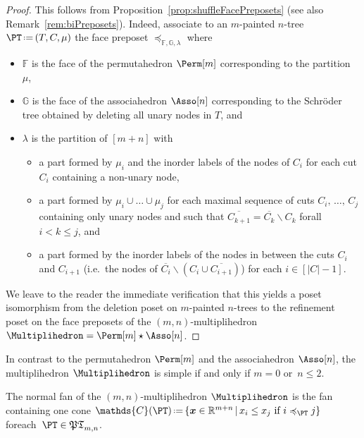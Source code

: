 \documentclass[AHL,Unicode,longabstracts,published]{cedram}
\newcommand{\R}{\mathbb{R}}
\renewcommand{\b}[1]{\boldsymbol{#1}}
\newcommand{\f}[1]{\mathfrak{#1}}
\newcommand{\ssm}{\smallsetminus}
\newcommand{\eqdef}{\mbox{\,\raisebox{0.2ex}{\scriptsize\ensuremath{\mathrm:}}\ensuremath{=}\,}}
\newcommand{\ie}{i.e.~}
\newcommand{\shuffleDP}{\star} %
\newcommand{\polytope}[1]{\mathds{#1}}
\newcommand{\stump}[1]{\overline{#1}}
\begin{document}
\begin{proof}
This follows from Proposition~\ref{prop:shuffleFacePreposets} (see also Remark~\ref{rem:biPreposets}). Indeed, associate to an $m$-painted $n$-tree $\PT \eqdef (T, C, \mu)$ the face preposet $\preccurlyeq_{\polytope{F}, \polytope{G}, \lambda}$ where
\begin{itemize}
\item $\polytope{F}$ is the face of the permutahedron $\Perm[m]$ corresponding to the partition~$\mu$,
\item $\polytope{G}$ is the face of the associahedron $\Asso[n]$ corresponding to the Schr\"oder tree obtained by deleting all unary nodes in $T$, and
\item $\lambda$ is the partition of $[m+n]$ with
\begin{itemize}
\item a part formed by $\mu_i$ and the inorder labels of the nodes of $C_i$ for each cut $C_i$ containing a non-unary node,
\item a part formed by $\mu_i \cup \dots \cup \mu_j$ for each maximal sequence of cuts $C_i,\,\dots,\,C_j$ containing only unary nodes and such that $\stump{C_{k+1}} = \stump{C_k} \ssm C_k$ for\linebreak all~$i < k \le j$, and
\item a part formed by the inorder labels of the nodes in between the cuts $C_i$ and $C_{i+1}$ (\ie the nodes of $\stump{C_i} \ssm (C_i \cup \stump{C_{i+1}})$) for each $i \in [|C|-1]$.
\end{itemize}
\end{itemize}
We leave to the reader the immediate verification that this yields a poset isomorphism from the deletion poset on $m$-painted $n$-trees to the refinement poset on the face preposets of the $(m,n)$-multiplihedron $\Multiplihedron = \Perm[m] \shuffleDP \Asso[n]$.
\end{proof}

\begin{rema}\label{rem:simpleMultiplihedron}
In contrast to the permutahedron $\Perm[m]$ and the associahedron $\Asso[n]$, the multiplihedron $\Multiplihedron$ is simple if and only if $m = 0$ or~$n \le 2$.
\end{rema}

\begin{prop}\label{prop:fanMultiplihedron}
The normal fan of the $(m,n)$-multiplihedron $\Multiplihedron$ is the fan containing one cone $\polytope{C}(\PT) \eqdef \{\b{x} \in \R^{m+n}\,|\,x_i \le x_j \text{ if } i \preccurlyeq_{\PT} j\}$ for\linebreak each~${\PT \in \f{PT}_{m,n}}$.
\end{prop}
\end{document}
